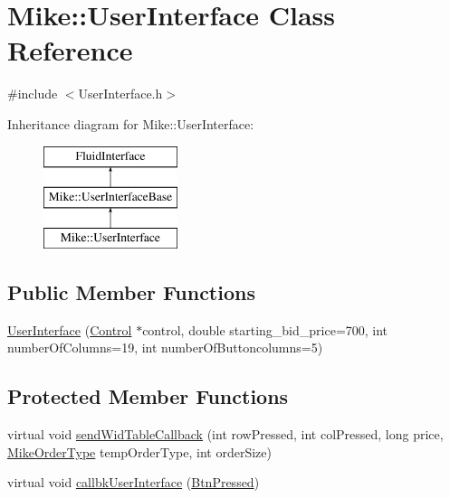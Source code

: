 \hypertarget{class_mike_1_1_user_interface}{}\section{Mike\+:\+:User\+Interface Class Reference}
\label{class_mike_1_1_user_interface}


{\ttfamily \#include $<$User\+Interface.\+h$>$}

Inheritance diagram for Mike\+:\+:User\+Interface\+:\begin{figure}[H]
\begin{center}
\leavevmode
\includegraphics[height=3.000000cm]{class_mike_1_1_user_interface}
\end{center}
\end{figure}
\subsection*{Public Member Functions}
\begin{DoxyCompactItemize}
\item 
\hyperlink{class_mike_1_1_user_interface_a3c10edd966f5470fb76a7ee844de2628}{User\+Interface} (\hyperlink{class_mike_1_1_control}{Control} $\ast$control, double starting\+\_\+bid\+\_\+price=700, int number\+Of\+Columns=19, int number\+Of\+Buttoncolumns=5)
\end{DoxyCompactItemize}
\subsection*{Protected Member Functions}
\begin{DoxyCompactItemize}
\item 
virtual void \hyperlink{class_mike_1_1_user_interface_a2001cad2040c95ddea43b7d43f9e82bb}{send\+Wid\+Table\+Callback} (int row\+Pressed, int col\+Pressed, long price, \hyperlink{namespace_mike_aa486aea8b1d0d07190982a311394e6cb}{Mike\+Order\+Type} temp\+Order\+Type, int order\+Size)
\item 
virtual void \hyperlink{class_mike_1_1_user_interface_a9421dadab2852eb9110e25e2dff1d849}{callbk\+User\+Interface} (\hyperlink{namespace_mike_a9dd611fa3c671b02e477e6b21465cc66}{Btn\+Pressed})
\end{DoxyCompactItemize}
